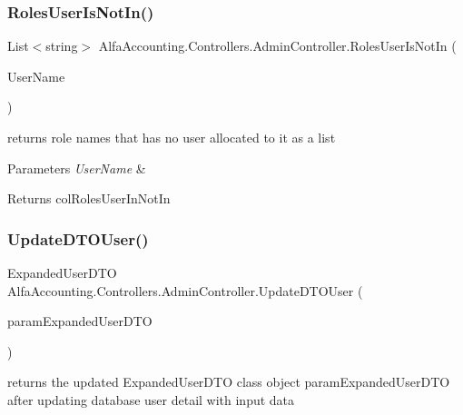 \subsubsection{\texorpdfstring{Roles\+User\+Is\+Not\+In()}{RolesUserIsNotIn()}}
{\footnotesize\ttfamily List$<$string$>$ Alfa\+Accounting.\+Controllers.\+Admin\+Controller.\+Roles\+User\+Is\+Not\+In (\begin{DoxyParamCaption}\item[{string}]{User\+Name }\end{DoxyParamCaption})\hspace{0.3cm}{\ttfamily [private]}}



returns role names that has no user allocated to it as a list 


\begin{DoxyParams}{Parameters}
{\em User\+Name} & \\
\hline
\end{DoxyParams}
\begin{DoxyReturn}{Returns}
col\+Roles\+User\+In\+Not\+In
\end{DoxyReturn}
\mbox{\label{class_alfa_accounting_1_1_controllers_1_1_admin_controller_acc3ea39bdbcb2412a2ad2d1d6c46c9e7}} 
\subsubsection{\texorpdfstring{Update\+D\+T\+O\+User()}{UpdateDTOUser()}}
{\footnotesize\ttfamily Expanded\+User\+D\+TO Alfa\+Accounting.\+Controllers.\+Admin\+Controller.\+Update\+D\+T\+O\+User (\begin{DoxyParamCaption}\item[{Expanded\+User\+D\+TO}]{param\+Expanded\+User\+D\+TO }\end{DoxyParamCaption})\hspace{0.3cm}{\ttfamily [private]}}



returns the updated Expanded\+User\+D\+TO class object param\+Expanded\+User\+D\+TO after updating database user detail with input data 


